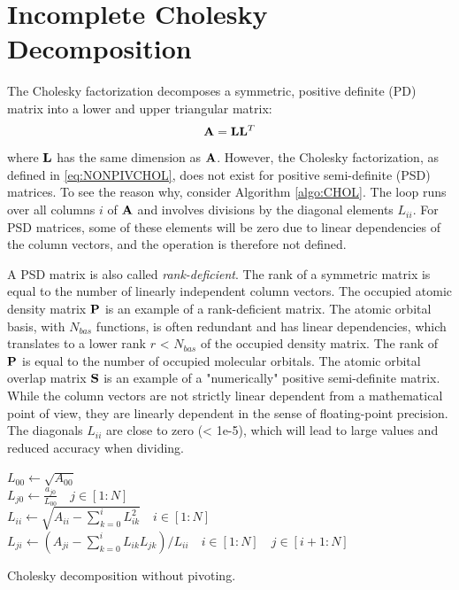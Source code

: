 
\section{Incomplete Cholesky Decomposition \label{sec:CHOLDEC}}

The Cholesky factorization decomposes a symmetric, positive definite (PD) matrix into a lower and upper triangular matrix:
\begin{equation}
\mathbf{A} = \mathbf{L} \mathbf{L}^T
\label{eq:NONPIVCHOL}
\end{equation}
\noindent where $\mathbf{L}$ has the same dimension as $\mathbf{A}$. However, the Cholesky factorization, as defined in \ref{eq:NONPIVCHOL}, does not exist for positive semi-definite (PSD) matrices. To see the reason why, consider Algorithm \ref{algo:CHOL}. The loop runs over all columns $i$ of $\mathbf{A}$  and involves divisions by the diagonal elements $L_{ii}$. For PSD matrices, some of these elements will be zero due to linear dependencies of the column vectors, and the operation is therefore not defined.
 
A PSD matrix is also called \emph{rank-deficient}. The rank of a symmetric matrix is equal to the number of linearly independent column vectors. The occupied atomic density matrix $\mathbf{P}$ is an example of a rank-deficient matrix. The atomic orbital basis, with $N_{bas}$ functions, is often redundant and has linear dependencies, which translates to a lower rank $r$ < $N_{bas}$ of the occupied density matrix. The rank of $\mathbf{P}$ is equal to the number of occupied molecular orbitals. The atomic orbital overlap matrix $\mathbf{S}$ is an example of a "numerically" positive semi-definite matrix. While the column vectors are not strictly linear dependent from a mathematical point of view, they are linearly dependent in the sense of floating-point precision. The diagonals $L_{ii}$ are close to zero (< 1e-5), which will lead to large values and reduced accuracy when dividing.  

\begin{algorithm}
$L_{00} \leftarrow \sqrt{A_00}$
\\
$L_{j0} \leftarrow \frac{a_{j0}}{L_{00}} \quad j \in [1:N]$
\\
$L_{ii} \leftarrow \sqrt{ A_{ii} - \sum_{k=0}^{i} L_{ik}^2} \quad i \in [1:N]$ 
\\
$L_{ji} \leftarrow \left( A_{ji} - \sum_{k=0}^{i} L_{ik} L_{jk} \right) / L_{ii} \quad i \in [1:N] \quad j \in [i+1:N]$
\caption{Cholesky decomposition without pivoting.}
\label{algo:CHOL}
\end{algorithm}

